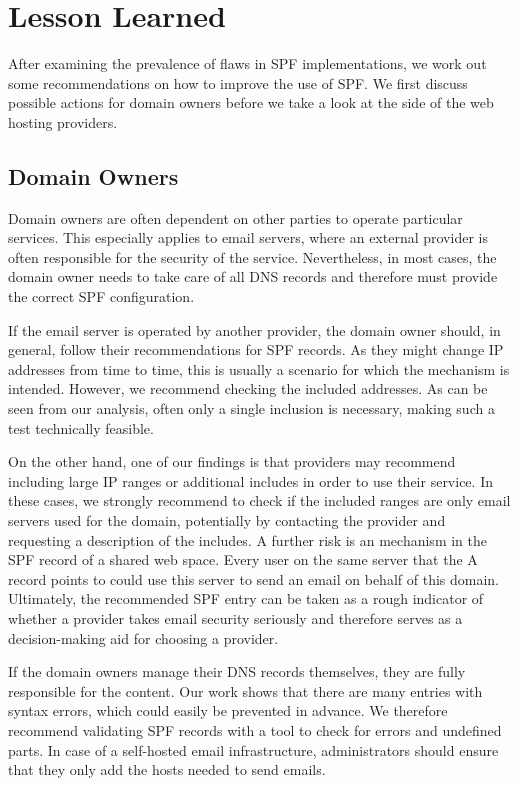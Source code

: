 \section{Lesson Learned}
\label{sec:recommendations}

After examining the prevalence of flaws in SPF implementations, we work out some recommendations on how to improve the use of SPF. We first discuss possible actions for domain owners before we take a look at the side of the web hosting providers.

\subsection{Domain Owners}
\label{sec:recommendations_domain}
Domain owners are often dependent on other parties to operate particular services.
This especially applies to email servers, where an external provider is often responsible for the security of the service.
Nevertheless, in most cases, the domain owner needs to take care of all DNS records and therefore must provide the correct SPF configuration.

If the email server is operated by another provider, the domain owner should, in general, follow their recommendations for \ac{SPF} records.
As they might change IP addresses from time to time, this is usually a scenario for which the  mechanism is intended.
However, we recommend checking the included addresses.
As can be seen from our analysis, often only a single inclusion is necessary, making such a test technically feasible.

On the other hand, one of our findings is that providers may recommend including large IP ranges or additional includes in order to use their service.
In these cases, we strongly recommend to check if the included ranges are only email servers used for the domain, potentially by contacting the provider and requesting a description of the includes.
A further risk is an  mechanism in the SPF record of a shared web space.
Every user on the same server that the A record points to could use this server to send an email on behalf of this domain.
Ultimately, the recommended SPF entry can be taken as a rough indicator of whether a provider takes email security seriously and therefore serves as a decision-making aid for choosing a provider.

If the domain owners manage their DNS records themselves, they are fully responsible for the content.
Our work shows that there are many entries with syntax errors, which could easily be prevented in advance.
We therefore recommend validating SPF records with a tool to check for errors and undefined parts.
In case of a self-hosted email infrastructure, administrators should ensure that they only add the hosts needed to send emails.


